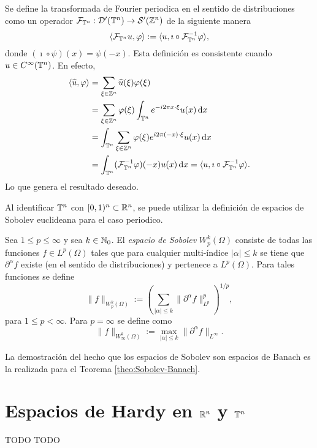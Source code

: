 \begin{definition}
	Se define la transformada de Fourier periodica en el sentido de distribuciones como un operador $\mathcal{F}_{\mathbb{T}^n}:\mathcal{D}'(\mathbb{T}^n)\to\mathcal{S}'(\mathbb{Z}^n)$ de la siguiente manera
	\begin{equation*}
		\langle\mathcal{F}_{\mathbb{T}^n}u, \varphi\rangle := \langle u, \imath \circ \mathcal{F}_{\mathbb{T}^n}^{-1}\varphi\rangle,
	\end{equation*}
	donde $(\imath\circ\psi)(x) = \psi(-x)$. Esta definición es consistente cuando $u\in C^\infty(\mathbb{T}^n)$. En efecto, 
	\begin{align*}
		\langle\widehat{u}, \varphi\rangle &= \sum_{\xi\in\mathbb{Z}^n}\widehat{u}(\xi)\varphi(\xi)\\
		& = \sum_{\xi\in\mathbb{Z}^n} \varphi(\xi) \int_{\mathbb{T}^n}e^{-i2\pi x\cdot\xi}  u(x) \mathop{}\!\mathrm{d} x \\
		& =\int_{\mathbb{T}^n}  \sum_{\xi\in\mathbb{Z}^n} \varphi(\xi) e^{i2\pi (-x)\cdot\xi}u(x)\mathop{}\!\mathrm{d} x \\
		& = \int_{\mathbb{T}^n} (\mathcal{F}_{\mathbb{T}^n}^{-1}\varphi)(-x) u(x) \mathop{}\!\mathrm{d} x = \langle u, \imath\circ \mathcal{F}_{\mathbb{T}^n}^{-1}\varphi\rangle.
	\end{align*}
	Lo que genera el resultado deseado.
\end{definition}
Al identificar $\mathbb{T}^n$ con $[0,1)^n\subset\mathbb{R}^n$, se puede utilizar la definición de espacios de Sobolev euclideana para el caso periodico.
\begin{definition}
	Sea $1\leq p \leq\infty$ y sea $k\in\mathbb{N}_0$. El \textit{espacio de Sobolev} $W^k_p(\Omega)$ consiste de todas las funciones $f\in L^p(\Omega)$ tales que para cualquier multi-índice $|\alpha|\leq k$ se tiene que $\partial^\alpha f$ existe (en el sentido de distribuciones) y pertenece a $L^p(\Omega)$. Para tales funciones se define 
	\begin{equation*}
		\|f\|_{W^k_p(\Omega)} := \left( \sum_{|\alpha|\leq k} \|\partial^\alpha f\|_{L^p}^p
		\right)^{1/p},
	\end{equation*}
	para $1\leq p <\infty$. Para $p=\infty$ se define como 
	\begin{equation*}
		\|f\|_{W^k_\infty(\Omega)} := \max_{|\alpha|\leq k} \|\partial^\alpha f\|_{L^\infty}.
	\end{equation*}
\end{definition}
La demostración del hecho que los espacios de Sobolev son espacios de Banach es la realizada para el Teorema \ref{theo:Sobolev-Banach}.
\section{Espacios de Hardy en $\mathbb{R}^n$ y $\mathbb{T}^n$}
TODO TODO


